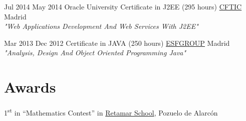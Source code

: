 \documentclass[letterpaper]{twentysecondcv} %
\begin{document}
\begin{twenty}
	\twentyitem
    	{Jul 2014}
		{May 2014}
        {Oracle University Certificate in J2EE (295 hours)}
        {\href{https://cftic.centrosdeformacion.empleo.madrid.org/}{CFTIC}}
        {}
        {Madrid\\
        \textit{"Web Applications Development And Web Services With J2EE"}}      
\end{twenty}

\begin{twenty}
	\twentyitem
    	{Mar 2013}
		{Dec 2012}
        {Certificate in JAVA (250 hours)}
        {\href{http://www.esf.es/}{ESFGROUP}}
        {}
        {Madrid\\
        \textit{"Analysis, Design And Object Oriented Programming Java"}}      
\end{twenty}

\section{Awards}

1\textsuperscript{st} in “Mathematics Contest” in \href{http://retamar.com/}{Retamar School}, Pozuelo de Alarcón
\end{document}
